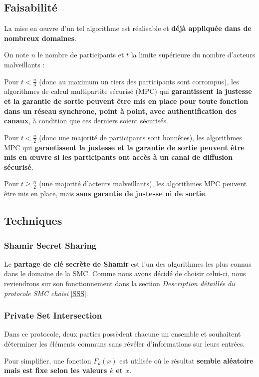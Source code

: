 \documentclass[12pt,a4paper]{article}
\begin{document}
\subsection{Faisabilité}
La mise en œuvre d'un tel algorithme est réalisable et \textbf{déjà appliquée dans de nombreux domaines}.

On note \( n \) le nombre de participants et \( t \) la limite supérieure du nombre d’acteurs malveillants :

Pour \( t < \frac{n}{3} \) (donc au maximum un tiers des participants sont corrompus), les algorithmes de calcul multipartite sécurisé (MPC) qui \textbf{garantissent la justesse et la garantie de sortie peuvent être mis en place pour toute fonction dans un réseau synchrone, point à point, avec authentification des canaux}, à condition que ces derniers soient sécurisés.

Pour \( t < \frac{n}{2} \) (donc une majorité de participants sont honnêtes), les algorithmes MPC qui \textbf{garantissent la justesse et la garantie de sortie peuvent être mis en œuvre si les participants ont accès à un canal de diffusion sécurisé}.

Pour \( t \geq \frac{n}{2} \) (une majorité d’acteurs malveillants), les algorithmes MPC peuvent être mis en place, mais \textbf{sans garantie de justesse ni de sortie}.
\subsection{Techniques}
\subsubsection{Shamir Secret Sharing}
Le \textbf{partage de clé secrète de Shamir} est l'un des algorithmes les plus connus dans le domaine de la SMC. Comme nous avons décidé de choisir celui-ci, nous reviendrons sur son fonctionnement dans la section \textit{Description détaillée du protocole SMC choisi} \ref{SSS}.

\subsubsection{Private Set Intersection}

Dans ce protocole, deux parties possèdent chacune un ensemble et souhaitent déterminer les éléments communs sans révéler d'informations sur leurs entrées.

Pour simplifier, une fonction \( F_k(x) \) est utilisée où le résultat \textbf{semble aléatoire mais est fixe selon les valeurs \( k \) et \( x \)}.
\end{document}
